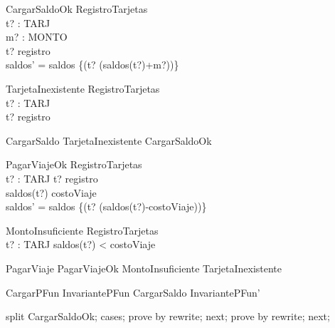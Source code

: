 \begin{schema}{CargarSaldoOk}
    \Delta RegistroTarjetas \\
    t? : TARJ \\
    m? : MONTO \\
\where
    t? \in registro \\
    saldos' = saldos \cup \{(t? \mapsto (saldos(t?)+m?))\} \\
\end{schema}

\begin{schema}{TarjetaInexistente}
    \Xi RegistroTarjetas \\
    t? : TARJ \\
\where
    t? \notin registro \\ 
\end{schema}

\begin{zed}
    CargarSaldo  TarjetaInexistente \lor CargarSaldoOk \\
\end{zed}

\begin{schema}{PagarViajeOk}
    \Delta RegistroTarjetas \\
    t? : TARJ 
\where
    t? \in registro \\
    saldos(t?) \geq costoViaje \\
    saldos' = saldos \cup \{(t? \mapsto (saldos(t?)-costoViaje))\} 
\end{schema}

\begin{schema}{MontoInsuficiente}
    \Xi RegistroTarjetas \\
    t? : TARJ 
\where
    saldos(t?) < costoViaje \\
\end{schema}

\begin{zed}
    PagarViaje  PagarViajeOk \lor MontoInsuficiente \lor TarjetaInexistente \\
\end{zed}

\begin{theorem}{CargarPFun}
    InvariantePFun \land  CargarSaldo \implies  InvariantePFun'
\end{theorem}

\begin{zproof}[CargarPFun]
    split CargarSaldoOk;
    cases;
    prove by rewrite;
    next;
    prove by rewrite;
    next;
\end{zproof}
